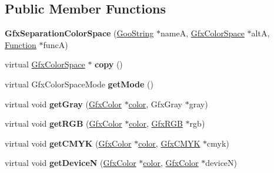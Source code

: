 \subsection*{Public Member Functions}
\begin{DoxyCompactItemize}
\item 
\mbox{\label{class_gfx_separation_color_space_ada03bc55517665e9a11954e5bcdd3665}} 
{\bfseries Gfx\+Separation\+Color\+Space} (\hyperlink{class_goo_string}{Goo\+String} $\ast$nameA, \hyperlink{class_gfx_color_space}{Gfx\+Color\+Space} $\ast$altA, \hyperlink{class_function}{Function} $\ast$funcA)
\item 
\mbox{\label{class_gfx_separation_color_space_a9e64ba9cb51a723c7e28890b288c617d}} 
virtual \hyperlink{class_gfx_color_space}{Gfx\+Color\+Space} $\ast$ {\bfseries copy} ()
\item 
\mbox{\label{class_gfx_separation_color_space_ae5b14fb601ae41d69aa712bbc1cb0b11}} 
virtual Gfx\+Color\+Space\+Mode {\bfseries get\+Mode} ()
\item 
\mbox{\label{class_gfx_separation_color_space_aa730b3dac8b1c8a34928c73a2cd4901c}} 
virtual void {\bfseries get\+Gray} (\hyperlink{struct_gfx_color}{Gfx\+Color} $\ast$\hyperlink{structcolor}{color}, Gfx\+Gray $\ast$gray)
\item 
\mbox{\label{class_gfx_separation_color_space_a0737b1ce0c12177d22df344a1808f2fc}} 
virtual void {\bfseries get\+R\+GB} (\hyperlink{struct_gfx_color}{Gfx\+Color} $\ast$\hyperlink{structcolor}{color}, \hyperlink{struct_gfx_r_g_b}{Gfx\+R\+GB} $\ast$rgb)
\item 
\mbox{\label{class_gfx_separation_color_space_ad95e766715bcd9b1bd5ac892e5f184ca}} 
virtual void {\bfseries get\+C\+M\+YK} (\hyperlink{struct_gfx_color}{Gfx\+Color} $\ast$\hyperlink{structcolor}{color}, \hyperlink{struct_gfx_c_m_y_k}{Gfx\+C\+M\+YK} $\ast$cmyk)
\item 
\mbox{\label{class_gfx_separation_color_space_a799005bdbaf1be7353d91f2e978c1497}} 
virtual void {\bfseries get\+DeviceN} (\hyperlink{struct_gfx_color}{Gfx\+Color} $\ast$\hyperlink{structcolor}{color}, \hyperlink{struct_gfx_color}{Gfx\+Color} $\ast$deviceN)

\end{DoxyCompactItemize}
